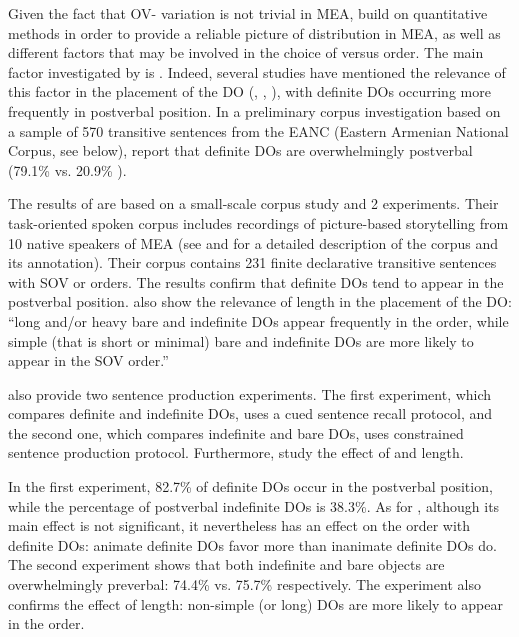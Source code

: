 \documentclass[output=paper,colorlinks,citecolor=brown,draftmode]{langscibook}
\begin{document}
Given the fact that OV- variation is not trivial in MEA, \citet{samvelian_persistence_2023} build on quantitative methods in order to provide a reliable picture of  distribution in MEA, as well as different factors that may be involved in the choice of  versus  order. The main factor investigated by \citet{samvelian_persistence_2023} is . Indeed, several studies have mentioned the relevance of this factor in the placement of the DO (\citealt{badikyan_zamanakakic_1976}, \citealt{dum-tragut_armenian_2009}, \citealt{stilo_preverbal_2018}), with definite DOs occurring more frequently in postverbal position. In a preliminary corpus investigation based on a sample of 570 transitive sentences from the EANC (Eastern Armenian National Corpus, see below), \citet{FaghiriSamvelian2020SOV} report that definite DOs are overwhelmingly postverbal (79.1\%  vs. 20.9\% ). 

The results of \citet{samvelian_persistence_2023} are based on a small-scale corpus study and 2 experiments. Their task-oriented spoken corpus includes recordings of picture-based storytelling from 10 native speakers of MEA (see \citealt{khurshudyan2006sredstva} and \citealt{samvelian_persistence_2023} for a detailed description of the corpus and its annotation). Their corpus contains 231 finite declarative transitive sentences with SOV or  orders. The results confirm that definite DOs tend to appear in the postverbal position. \citet[476]{samvelian_persistence_2023} also show the relevance of length in the placement of the DO: “long and/or heavy bare and indefinite DOs appear frequently in the  order, while simple (that is short or minimal) bare and indefinite DOs are more likely to appear in the SOV order.”

\citet{samvelian_persistence_2023} also provide two sentence production experiments. The first experiment, which compares definite and indefinite DOs, uses a cued sentence recall protocol, and the second one, which compares indefinite and bare DOs, uses constrained sentence production protocol. Furthermore, \citet{samvelian_persistence_2023} study the effect of  and length. 

In the first experiment, 82.7\% of definite DOs occur in the postverbal position, while the percentage of postverbal indefinite DOs is 38.3\%. As for , although its main effect is not significant, it nevertheless has an effect on the order with definite DOs: animate definite DOs favor  more than inanimate definite DOs do. The second experiment shows that both indefinite and bare objects are overwhelmingly preverbal: 74.4\% vs. 75.7\% respectively. The experiment also confirms the effect of length: non-simple (or long) DOs are more likely to appear in the  order.
\end{document}
